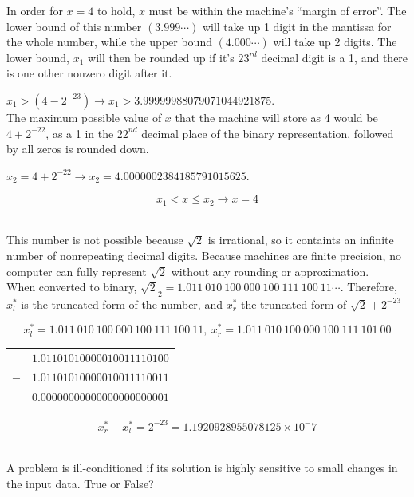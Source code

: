 \item
	In order for $x=4$ to hold, $x$ must be within the machine's ``margin of error''. The lower bound of this number $(3.999\cdots)$ will
	take up 1 digit in the mantissa for the whole number, while the upper bound $(4.000\cdots)$ will take up 2 digits. The lower bound,
	$x_1$ will then be rounded up if it's $23^{rd}$ decimal digit is a 1, and there is one other nonzero digit after it.

	$x_1 > (4-2^{-23}) \rightarrow x_1 > 3.99999988079071044921875$. \\

	The maximum possible value of $x$ that the machine will store as 4 would be $4+2^{-22}$, as a 1 in the $22^{nd}$ decimal place
	of the binary representation, followed by all zeros is rounded down.

	$x_2 = 4+2^{-22} \rightarrow x_2 = 4.0000002384185791015625$.

	$$x_1 < x \leq x_2 \rightarrow x=4$$ \\

\item

	This number is not possible because $\sqrt{2}$ is irrational, so it containts an infinite number of nonrepeating decimal digits.
	Because machines are finite precision, no computer can fully represent $\sqrt{2}$ without any rounding or approximation. \\

	When converted to binary, $\sqrt{2}_2 = 1.011\ 010\ 100\ 000\ 100\ 111\ 100\ 11\cdots$. Therefore, $x^*_l$ is the truncated form
	of the number, and $x^*_r$ the truncated form of $\sqrt{2} + 2^{-23}$

	$$x^*_l = 1.011\ 010\ 100\ 000\ 100\ 111\ 100\ 11,\ x^*_r = 1.011\ 010\ 100\ 000\ 100\ 111\ 101\ 00$$

	\begin{center}
	\begin{tabular}{cc}
		&$1.01101010000010011110100$ \\
		$-$ & $1.01101010000010011110011$ \\
		\hline
		&$0.00000000000000000000001$ \\
	\end{tabular}
	\end{center}

	$$x^*_r - x^*_l = 2^{-23} = 1.1920928955078125×10^-7$$ \\

\eenum

\item
\benum
\item A problem is ill-conditioned if its solution is highly sensitive to small changes in the input data.  True or False? \\

